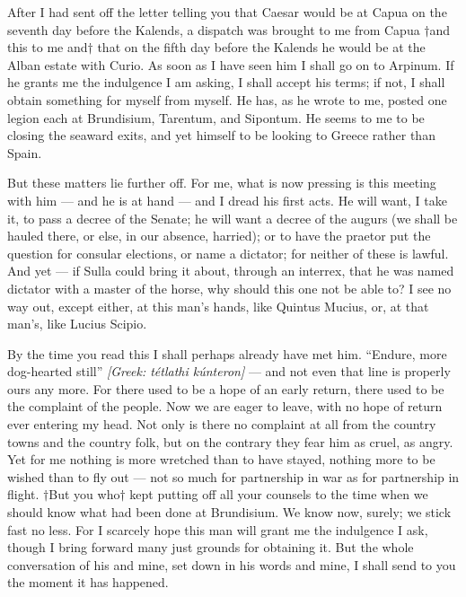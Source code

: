 

 After I had sent off the letter telling you that Caesar would be at Capua on the seventh day before the Kalends, a dispatch was brought to me from Capua $\dagger$and this to me and$\dagger$ that on the fifth day before the Kalends he would be at the Alban estate with Curio. As soon as I have seen him I shall go on to Arpinum. If he grants me the indulgence I am asking, I shall accept his terms; if not, I shall obtain something for myself from myself. He has, as he wrote to me, posted one legion each at Brundisium, Tarentum, and Sipontum. He seems to me to be closing the seaward exits, and yet himself to be looking to Greece rather than Spain.

 But these matters lie further off. For me, what is now pressing is this meeting with him --- and he is at hand --- and I dread his first acts. He will want, I take it, to pass a decree of the Senate; he will want a decree of the augurs (we shall be hauled there, or else, in our absence, harried); or to have the praetor put the question for consular elections, or name a dictator; for neither of these is lawful. And yet --- if Sulla could bring it about, through an interrex, that he was named dictator with a master of the horse, why should this one not be able to? I see no way out, except either, at this man's hands, like Quintus Mucius, or, at that man's, like Lucius Scipio.

 By the time you read this I shall perhaps already have met him. ``Endure, more dog-hearted still'' \textit{[Greek: t\'etlathi k\'unteron]} --- and not even that line is properly ours any more. For there used to be a hope of an early return, there used to be the complaint of the people. Now we are eager to leave, with no hope of return ever entering my head. Not only is there no complaint at all from the country towns and the country folk, but on the contrary they fear him as cruel, as angry. Yet for me nothing is more wretched than to have stayed, nothing more to be wished than to fly out --- not so much for partnership in war as for partnership in flight. $\dagger$But you who$\dagger$ kept putting off all your counsels to the time when we should know what had been done at Brundisium. We know now, surely; we stick fast no less. For I scarcely hope this man will grant me the indulgence I ask, though I bring forward many just grounds for obtaining it. But the whole conversation of his and mine, set down in his words and mine, I shall send to you the moment it has happened.

